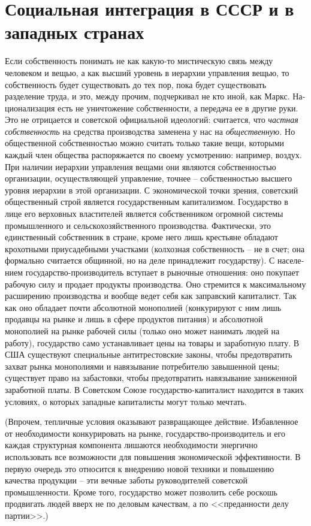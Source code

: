 \documentclass{book}
\begin{document}
\section{Социальная интеграция в СССР и в западных странах}

Если собственность понимать не как какую-то мистическую связь между человеком и вещью, а как высший уровень в ие­рархии управления вещью, то собственность будет существо­вать до тех пор, пока будет существовать разделение труда, и это, между прочим, подчеркивал не кто иной, как Маркс. На­ционализация есть не уничтожение собственности, а передача ее в другие руки. Это не отрицается и советской официальной идеологий: считается, что \textit{частная собственность}  на средства производства заменена у нас на \textit{общественную.}  Но общественной собственностью можно считать только такие вещи, кото­рыми каждый член общества распоряжается по своему усмот­рению: например, воздух. При наличии иерархии управления вещами они являются собственностью организации, осущест­вляющей управление, точнее -- собственностью высшего уров­ня иерархии в этой организации. С экономической точки зре­ния, советский общественный строй является государственным капитализмом. Государство в лице его верховных властите­лей является собственником огромной 
системы промышлен­ного и сельскохозяйственного производства. Фактически, это единственный собственник в стране, кроме него лишь кре­стьяне обладают крохотными приусадебными участками (кол­хозная собственность -- не в счет; она формально считается общинной, но на деле принадлежит государству). С населе­нием государство-производитель вступает в рыночные отно­шения: оно покупает рабочую силу и продает продукты произ­водства. Оно стремится к максимальному расширению произ­водства и вообще ведет себя как заправский капиталист. Так как оно обладает почти абсолютной монополией (конкурируют с ним лишь продавцы на рынке и лишь в сфере продуктов пи­тания) и абсолютной монополией на рынке рабочей силы (толь­ко оно может нанимать людей на работу), государство само устанавливает цены на товары и заработную плату. В США су­ществуют специальные антитрестовские законы, чтобы предот­вратить захват рынка монополиями и навязывание потребите­лю завышенной цены; существует право на забастовки, чтобы предотвратить навязывание 
заниженной заработной платы. В Советском Союзе государство-капиталист находится в таких условиях, о которых западные капиталисты могут только мечтать.

(Впрочем, тепличные условия оказывают развращающее действие. Избавленное от необходимости конкурировать на рынке, государство-производитель и его каждая структурная компонента лишаются необходимости энергично использовать все возможности для повышения экономической эффективности. В первую очередь это относится к внедрению новой техники и повышению качества продукции -- эти вечные заботы руководителей советской промышленности. Кроме того, государство может позволить себе роскошь продвигать людей вверх не по деловым качествам, а по <<преданности делу партии>>.)
\end{document}
